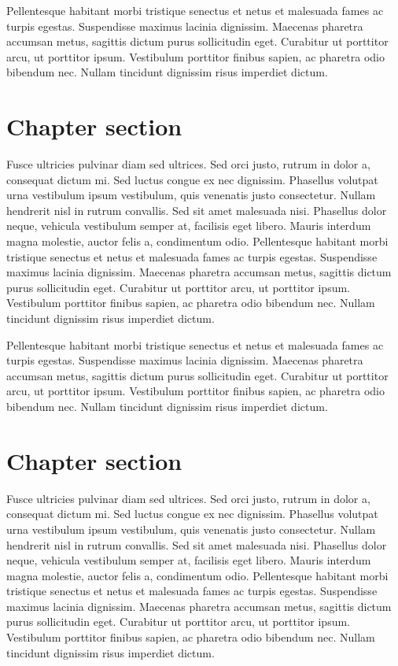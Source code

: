 Pellentesque habitant morbi tristique senectus et netus et malesuada fames ac turpis egestas. Suspendisse maximus lacinia dignissim. Maecenas pharetra accumsan metus, sagittis dictum purus sollicitudin eget. Curabitur ut porttitor arcu, ut porttitor ipsum. Vestibulum porttitor finibus sapien, ac pharetra odio bibendum nec. Nullam tincidunt dignissim risus imperdiet dictum.
\section{Chapter section}
Fusce ultricies pulvinar diam sed ultrices. Sed orci justo, rutrum in dolor a, consequat dictum mi. Sed luctus congue ex nec dignissim. Phasellus volutpat urna vestibulum ipsum vestibulum, quis venenatis justo consectetur. Nullam hendrerit nisl in rutrum convallis. Sed sit amet malesuada nisi. Phasellus dolor neque, vehicula vestibulum semper at, facilisis eget libero. Mauris interdum magna molestie, auctor felis a, condimentum odio. Pellentesque habitant morbi tristique senectus et netus et malesuada fames ac turpis egestas. Suspendisse maximus lacinia dignissim. Maecenas pharetra accumsan metus, sagittis dictum purus sollicitudin eget. Curabitur ut porttitor arcu, ut porttitor ipsum. Vestibulum porttitor finibus sapien, ac pharetra odio bibendum nec. Nullam tincidunt dignissim risus imperdiet dictum.

Pellentesque habitant morbi tristique senectus et netus et malesuada fames ac turpis egestas. Suspendisse maximus lacinia dignissim. Maecenas pharetra accumsan metus, sagittis dictum purus sollicitudin eget. Curabitur ut porttitor arcu, ut porttitor ipsum. Vestibulum porttitor finibus sapien, ac pharetra odio bibendum nec. Nullam tincidunt dignissim risus imperdiet dictum.

\section{Chapter section}
Fusce ultricies pulvinar diam sed ultrices. Sed orci justo, rutrum in dolor a, consequat dictum mi. Sed luctus congue ex nec dignissim. Phasellus volutpat urna vestibulum ipsum vestibulum, quis venenatis justo consectetur. Nullam hendrerit nisl in rutrum convallis. Sed sit amet malesuada nisi. Phasellus dolor neque, vehicula vestibulum semper at, facilisis eget libero. Mauris interdum magna molestie, auctor felis a, condimentum odio. Pellentesque habitant morbi tristique senectus et netus et malesuada fames ac turpis egestas. Suspendisse maximus lacinia dignissim. Maecenas pharetra accumsan metus, sagittis dictum purus sollicitudin eget. Curabitur ut porttitor arcu, ut porttitor ipsum. Vestibulum porttitor finibus sapien, ac pharetra odio bibendum nec. Nullam tincidunt dignissim risus imperdiet dictum.

